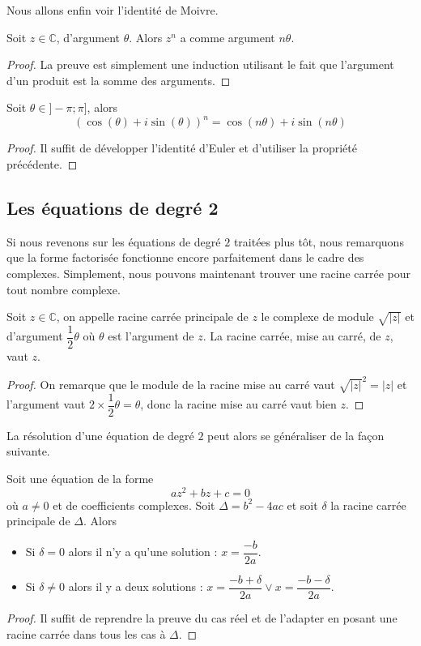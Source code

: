 Nous allons enfin voir l'identité de Moivre.

\begin{prop}
    Soit $z\in\mathbb C$, d'argument $\theta$. Alors $z^n$ a comme argument $n\theta$.
\end{prop}
\begin{proof}
    La preuve est simplement une induction utilisant le fait que l'argument d'un produit est la somme des arguments.
\end{proof}

\begin{them}
    Soit $\theta\in]-\pi;\pi]$, alors $$(\cos(\theta)+i\sin(\theta))^n = \cos(n\theta)+i\sin(n\theta)$$
\end{them}
\begin{proof}
    Il suffit de développer l'identité d'Euler et d'utiliser la propriété précédente.
\end{proof}

\subsection{Les équations de degré 2}

Si nous revenons sur les équations de degré $2$ traitées plus tôt, nous remarquons que la forme factorisée fonctionne encore parfaitement dans le cadre des complexes. Simplement, nous pouvons maintenant trouver une racine carrée pour tout nombre complexe.

\begin{defi}
    Soit $z\in\mathbb C$, on appelle racine carrée principale de $z$ le complexe de module $\sqrt{|z|}$ et d'argument $\dfrac{1}{2}\theta$ où $\theta$ est l'argument de $z$. La racine carrée, mise au carré, de $z$, vaut $z$.
\end{defi}
\begin{proof}
    On remarque que le module de la racine mise au carré vaut $\sqrt{|z|}^2=|z|$ et l'argument vaut $2\times \dfrac{1}{2}\theta = \theta$, donc la racine mise au carré vaut bien $z$.
\end{proof}

La résolution d'une équation de degré $2$ peut alors se généraliser de la façon suivante.

\begin{them}
    Soit une équation de la forme $$az^2+bz+c=0$$ où $a\neq 0$ et de coefficients complexes. Soit $\Delta = b^2-4ac$ et soit $\delta$ la racine carrée principale de $\Delta$. Alors
    \begin{itemize}[label=$\bullet$]
        \item Si $\delta = 0$ alors il n'y a qu'une solution : $x=\dfrac{-b}{2a}$.
        \item Si $\delta \neq 0$ alors il y a deux solutions : $x=\dfrac{-b+\delta}{2a}\lor x = \dfrac{-b-\delta}{2a}$.
    \end{itemize}
\end{them}
\begin{proof}
    Il suffit de reprendre la preuve du cas réel et de l'adapter en posant une racine carrée dans tous les cas à $\Delta$.
\end{proof}

\newpage